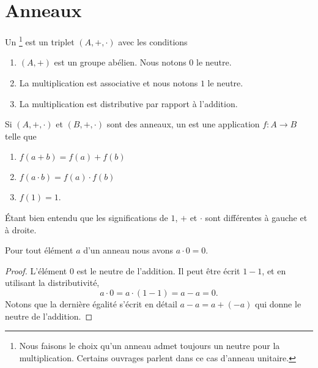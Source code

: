 \section{Anneaux}

\begin{definition}     \label{DefHXJUooKoovob}
    Un \footnote{Nous faisons le choix qu'un anneau admet toujours un neutre pour la multiplication. Certains ouvrages parlent dans ce cas d'anneau unitaire.} est un triplet \( (A,+,\cdot)\) avec les conditions
    \begin{enumerate}
        \item
            \( (A,+)\) est un groupe abélien. Nous notons \( 0\) le neutre.
        \item
            La multiplication est associative et nous notons \( 1\) le neutre.
        \item
            La multiplication est distributive par rapport à l'addition.
    \end{enumerate}
\end{definition}

\begin{definition}      \label{DEFooSPHPooCwjzuz}
    Si \( (A,+,\cdot)\) et \( (B,+,\cdot)\) sont des anneaux, un  est une application \( f\colon A\to B\) telle que
    \begin{enumerate}
        \item \( f(a+b)=f(a)+f(b)\)
        \item
            \( f(a\cdot b)=f(a)\cdot f(b)\)
        \item
            \( f(1)=1\).
    \end{enumerate}
    Étant bien entendu que les significations de \( 1\), $+$ et \( \cdot\) sont différentes à gauche et à droite.
\end{definition}

\begin{lemma}       \label{LEMooVUSMooWisQpD}
    Pour tout élément \( a\) d'un anneau nous avons \( a\cdot 0=0\).
\end{lemma}

\begin{proof}
    L'élément \( 0\) est le neutre de l'addition. Il peut être écrit \( 1-1\), et en utilisant la distributivité,
    \begin{equation}
        a\cdot 0=a\cdot (1-1)=a-a=0.
    \end{equation}
    Notons que la dernière égalité s'écrit en détail \( a-a=a+(-a)\) qui donne le neutre de l'addition.
\end{proof}

